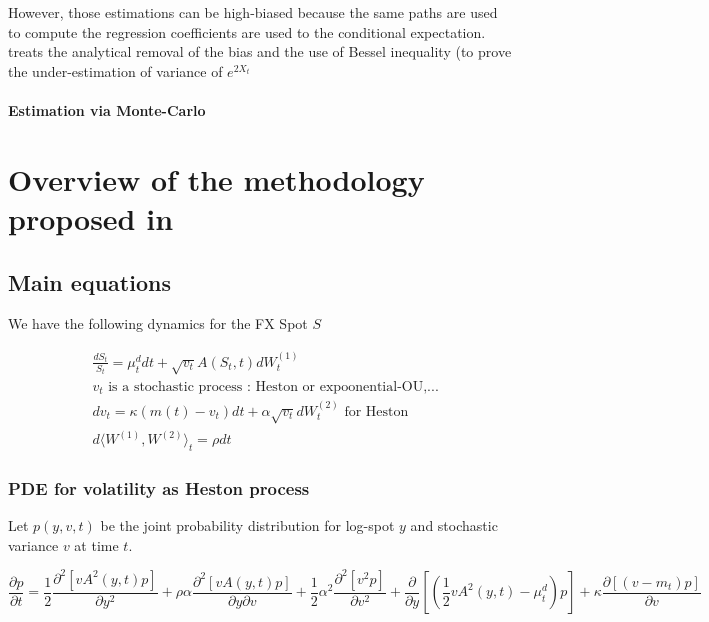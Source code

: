 \documentclass{article}
\begin{document}
\noindent However, those estimations can be high-biased because the same paths are used to compute the regression coefficients are used to the conditional expectation. \cite{Humeau2013} treats the analytical removal of the bias and the use of Bessel inequality (to prove the under-estimation of variance of $e^{2X_t}$

\paragraph{Estimation via Monte-Carlo}

\section{Overview of the methodology proposed in \cite{Clark2010}}
\subsection{Main equations}

We have the following dynamics for the FX Spot $S$

\begin{equation}
\begin{aligned}
	&\frac{dS_t}{S_t} = \mu^d_t dt + \sqrt{v_t} A(S_t,t) dW_t^{(1)}\\
	&v_t \text{ is a stochastic process : Heston or expoonential-OU,...}\\
	&dv_t = \kappa (m(t) - v_t) dt + \alpha \sqrt{v_t} dW_t^{(2)} \text{ for Heston}\\
	&d\langle W^{(1)}, W^{(2)} \rangle_t = \rho dt
\end{aligned}
\end{equation}


\subsubsection{PDE for volatility as Heston process}
Let $p(y,v,t)$ be the joint probability distribution for log-spot $y$ and stochastic variance $v$ at time $t$.

\begin{equation}
	\frac{\partial p}{\partial t} = \frac{1}{2} \frac{\partial^2 \left[vA^2(y,t)p\right]}{\partial y^2} + \rho \alpha \frac{\partial^2 \left[vA(y,t)p\right]}{\partial y \partial v} + \frac{1}{2} \alpha^2 \frac{\partial^2 \left[v^2 p \right]}{\partial v^2} + \frac{\partial }{\partial y} \left[\left(\frac{1}{2} vA^2(y,t) - \mu^d_t\right)p\right] + \kappa \frac{\partial \left[\left(v-m_t\right) p\right]}{\partial v}
\end{equation}
\end{document}

